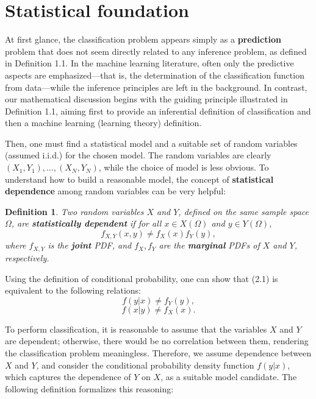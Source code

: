 \documentclass{report}
\newtheorem{definition}{Definition}[chapter]
\begin{document}
\section{Statistical foundation}
At first glance, the classification problem appears simply as a \textbf{prediction} problem that does not seem directly related to any inference problem, as defined in Definition 1.1. In the machine learning literature, often only the predictive aspects are emphasized—that is, the determination of the classification function from data—while the inference principles are left in the background. In contrast, our mathematical discussion begins with the guiding principle illustrated in Definition 1.1, aiming first to provide an inferential definition of classification and then a machine learning (learning theory) definition.

Then, one must find a statistical model and a suitable set of random variables (assumed i.i.d.) for the chosen model. The random variables are clearly $(X_1,Y_1),\dots,(X_N,Y_N)$, while the choice of model is less obvious. To understand how to build a reasonable model, the concept of \textbf{statistical dependence} among random variables can be very helpful:

\begin{definition}
Two random variables $X$ and $Y$, defined on the same sample space $\Omega$, are \textbf{statistically dependent} if for all $x\in X(\Omega)$ and $y \in Y(\Omega)$,
\begin{equation}
f_{X,Y}(x,y) \neq f_X(x)f_Y(y),
\end{equation}
where $f_{X,Y}$ is the \textbf{joint} PDF, and $f_X,f_Y$ are the \textbf{marginal} PDFs of $X$ and $Y$, respectively.
\end{definition}

Using the definition of conditional probability, one can show that (2.1) is equivalent to the following relations:
\begin{equation}
f(y|x) \neq f_Y(y),
\end{equation}
\begin{equation}
f(x|y) \neq f_X(x).
\end{equation}

To perform classification, it is reasonable to assume that the variables $X$ and $Y$ are dependent; otherwise, there would be no correlation between them, rendering the classification problem meaningless. Therefore, we assume dependence between $X$ and $Y$, and consider the conditional probability density function $f(y|x)$, which captures the dependence of $Y$ on $X$, as a suitable model candidate. The following definition formalizes this reasoning:
\end{document}
